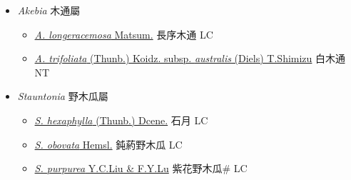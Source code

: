 
  \begin{itemize}
 \item[] \textit{Akebia} 木通屬
                    
  \begin{itemize}
        \item[] \href{http://www.theplantlist.org/tpl1.1/search?q=Akebia+longeracemosa}{\textit{A. longeracemosa} Matsum.}   長序木通 LC
        \item[] \href{http://www.theplantlist.org/tpl1.1/search?q=Akebia+trifoliata+subsp.+australis}{\textit{A. trifoliata} (Thunb.) Koidz. subsp. \textit{australis} (Diels) T.Shimizu}   白木通 NT
  \end{itemize}
 \item[] \textit{Stauntonia} 野木瓜屬
                    
  \begin{itemize}
        \item[] \href{http://www.theplantlist.org/tpl1.1/search?q=Stauntonia+hexaphylla}{\textit{S. hexaphylla} (Thunb.) Dcene.}     石月 LC
        \item[] \href{http://www.theplantlist.org/tpl1.1/search?q=Stauntonia+obovata}{\textit{S. obovata} Hemsl.}   鈍葯野木瓜 LC
        \item[] \href{http://www.theplantlist.org/tpl1.1/search?q=Stauntonia+purpurea}{\textit{S. purpurea} Y.C.Liu \& F.Y.Lu}   紫花野木瓜\# LC
  \end{itemize}
  \end{itemize}
